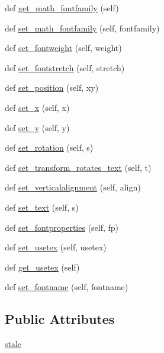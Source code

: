 \begin{DoxyCompactItemize}
\item 
def \hyperlink{classmatplotlib_1_1text_1_1Text_afa9b5e84ede3b846fd7ba7df77b4a477}{get\+\_\+math\+\_\+fontfamily} (self)
\item 
def \hyperlink{classmatplotlib_1_1text_1_1Text_a864da9a49be2a65fed6ec3406a4cf659}{set\+\_\+math\+\_\+fontfamily} (self, fontfamily)
\item 
def \hyperlink{classmatplotlib_1_1text_1_1Text_a8de130a872844a2fb97909c59a9831ea}{set\+\_\+fontweight} (self, weight)
\item 
def \hyperlink{classmatplotlib_1_1text_1_1Text_a99e10c69da0ccfd58709ca0cc917a1fa}{set\+\_\+fontstretch} (self, stretch)
\item 
def \hyperlink{classmatplotlib_1_1text_1_1Text_a9156cde9aabd06b234f07df6060b843e}{set\+\_\+position} (self, xy)
\item 
def \hyperlink{classmatplotlib_1_1text_1_1Text_a1a34601df138416a8d6e70b70b75f5f3}{set\+\_\+x} (self, x)
\item 
def \hyperlink{classmatplotlib_1_1text_1_1Text_a14a8a79e3d231e38dd4993d9b9753343}{set\+\_\+y} (self, y)
\item 
def \hyperlink{classmatplotlib_1_1text_1_1Text_a7f946ecbbfdcb43690fa0922d0fcdfc1}{set\+\_\+rotation} (self, s)
\item 
def \hyperlink{classmatplotlib_1_1text_1_1Text_ae4a470f970808306a348a48718b15d8c}{set\+\_\+transform\+\_\+rotates\+\_\+text} (self, t)
\item 
def \hyperlink{classmatplotlib_1_1text_1_1Text_a0d73ddae6df696dc0a2cb8077ac2abb5}{set\+\_\+verticalalignment} (self, align)
\item 
def \hyperlink{classmatplotlib_1_1text_1_1Text_ad561798c62fcca578ab1ed7375338bea}{set\+\_\+text} (self, s)
\item 
def \hyperlink{classmatplotlib_1_1text_1_1Text_a135667b116b607dbb9fd9985c1cdcbb9}{set\+\_\+fontproperties} (self, fp)
\item 
def \hyperlink{classmatplotlib_1_1text_1_1Text_a314a3c01352599f5644310a4be4563d8}{set\+\_\+usetex} (self, usetex)
\item 
def \hyperlink{classmatplotlib_1_1text_1_1Text_a0aa4725d153f5ceb705e1762f27b784e}{get\+\_\+usetex} (self)
\item 
def \hyperlink{classmatplotlib_1_1text_1_1Text_a77326ad290ca2416d9a8b8002b402ea2}{set\+\_\+fontname} (self, fontname)
\end{DoxyCompactItemize}
\subsection*{Public Attributes}
\begin{DoxyCompactItemize}
\item 
\hyperlink{classmatplotlib_1_1text_1_1Text_ac11dc8372896b00e972ed599f4693a21}{stale}
\end{DoxyCompactItemize}

